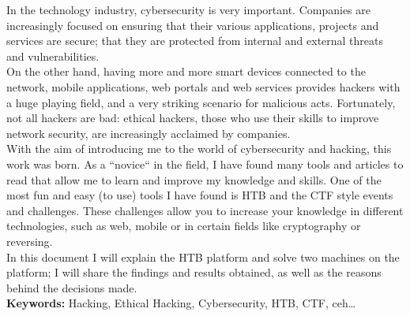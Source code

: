 In the technology industry, cybersecurity is very important. Companies are increasingly focused on ensuring that their various applications, projects and services are secure; that they are protected from internal and external threats and vulnerabilities.\\

On the other hand, having more and more smart devices connected to the network, mobile applications, web portals and web services provides hackers with a huge playing field, and a very striking scenario for malicious acts. Fortunately, not all hackers are bad: ethical hackers, those who use their skills to improve network security, are increasingly acclaimed by companies.\\

With the aim of introducing me to the world of cybersecurity and hacking, this work was born. As a ``novice`` in the field, I have found many tools and articles to read that allow me to learn and improve my knowledge and skills. One of the most fun and easy (to use) tools I have found is \acrlong{HTB} and the \acrlong{CTF} style events and challenges. These challenges allow you to increase your knowledge in different technologies, such as web, mobile or in certain fields like cryptography or reversing.\\

In this document I will explain the \acrlong{HTB} platform and solve two machines on the platform; I will share the findings and results obtained, as well as the reasons behind the decisions made.\\

\textbf{Keywords:} Hacking, Ethical Hacking, Cybersecurity, \acrlong{HTB}, \acrlong{CTF}, \acrlong{ceh}\ldots
